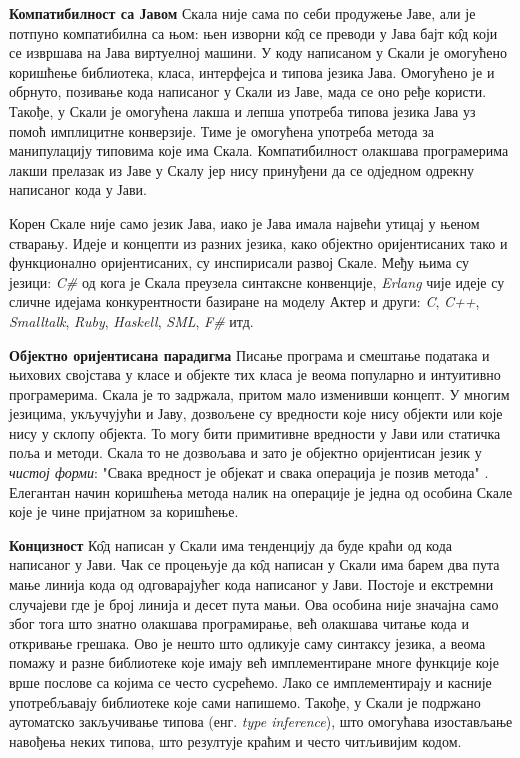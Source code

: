 \documentclass[12pt,oneside]{memoir}
\begin{document}
\begin{description}
\item \textbf{Компатибилност са Јавом} Скала није сама по себи продужење Јаве, али је потпуно компатибилна са њом: њен изворни к\^{о}д се преводи у Јава бајт к\^{о}д који се извршава на Јава виртуелној машини. У коду написаном у Скали је омогућено коришћење библиотека, класа, интерфејса и типова језика Јава. Омогућено је и обрнуто, позивање кода написаног у Скали из Јаве, мада се оно ређе користи. Такође, у Скали је омогућена лакша и лепша употреба типова језика Јава уз помоћ имплицитне конверзије. Тиме је омогућена употреба метода за манипулацију типовима које има Скала. Компатибилност олакшава програмерима лакши прелазак из Јаве у Скалу јер нису принуђени да се одједном одрекну написаног кода у Јави.

Корен Скале није само језик Јава, иако је Јава имала највећи утицај у њеном стварању. Идеје и концепти из разних језика, како објектно оријентисаних тако и функционално оријентисаних, су инспирисали развој Скале. Међу њима су језици: \textit{C\#}  од кога је Скала преузела синтаксне конвенције, \textit{Erlang} чије идеје су сличне идејама конкурентности базиране на моделу Актер и други: \textit{C}, \textit{C++},  \textit{Smalltalk}, \textit{Ruby}, \textit{Haskell}, \textit{SML}, \textit{F\#} итд.

\item \textbf{Објектно оријентисана парадигма} Писање програма и смештање података и њихових својстава у класе и објекте тих класа је веома популарно и интуитивно програмерима. Скала је то задржала, притом мало изменивши концепт. У многим језицима, укључујући и Јаву, дозвољене су вредности које нису објекти или које нису у склопу објекта. То могу бити примитивне вредности у Јави или статичка поља и методи. Скала то не дозвољава и зато је објектно оријентисан језик у \textit{чистој форми}: "Свака вредност је објекат и свака операција је позив метода" \cite{progInScala}. Елегантан начин коришћења метода налик на операције је једна од особина Скале које је чине пријатном за коришћење.

\item \textbf{Концизност} К\^{о}д написан у Скали има тенденцију да буде краћи од кода написаног у Јави. Чак се процењује да к\^{о}д написан у Скали има барем два пута мање линија кода од одговарајућег кода написаног у Јави. Постоје и екстремни случајеви где је број линија и десет пута мањи. Ова особина није значајна само због тога што знатно олакшава програмирање, већ олакшава читање кода и откривање грешака. Ово је нешто што одликује саму синтаксу језика, а веома помажу и разне библиотеке које имају већ имплементиране многе функције које врше послове са којима се често сусрећемо. Лако се имплементирају и касније употребљавају библиотеке које сами напишемо. Такође, у Скали је подржано аутоматско закључивање типова (енг. \textit{type inference}), што омогућава изостављање навођења неких типова, што резултује краћим и често читљивијим кодом.


\end{description}
\end{document}
